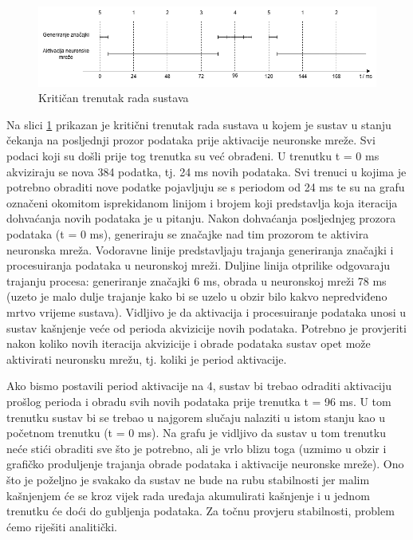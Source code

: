 \begin{figure}[htb]
    \centering
    \includegraphics[width=1\linewidth]{Chapters/implementacija/rts.png} 
    \caption{Kritičan trenutak rada sustava}
    \label{pic:rts}
\end{figure}

Na slici \ref{pic:rts} prikazan je kritični trenutak rada sustava u kojem je sustav 
u stanju čekanja na posljednji prozor podataka prije aktivacije neuronske mreže. Svi
podaci koji su došli prije tog trenutka su već obrađeni. U trenutku t = 0 ms akviziraju se
nova 384 podatka, tj. 24 ms novih podataka. Svi trenuci u kojima je potrebno obraditi nove podatke
pojavljuju se s periodom od 24 ms te su na grafu označeni okomitom isprekidanom linijom i brojem
koji predstavlja koja iteracija dohvaćanja novih podataka je u pitanju. Nakon dohvaćanja
posljednjeg prozora podataka (t = 0 ms), generiraju se značajke nad tim prozorom te aktivira neuronska mreža.
Vodoravne linije predstavljaju trajanja
generiranja značajki i procesuiranja podataka u neuronskoj mreži. Duljine linija otprilike
odgovaraju trajanju procesa: generiranje značajki 6 ms, obrada u neuronskoj mreži 78 ms 
(uzeto je malo dulje trajanje kako bi se uzelo u obzir bilo kakvo nepredviđeno mrtvo vrijeme sustava).
Vidljivo je da aktivacija i procesuiranje podataka unosi u sustav kašnjenje veće od perioda
akvizicije novih podataka. Potrebno je provjeriti nakon koliko novih iteracija akvizicije i obrade
podataka sustav opet može aktivirati neuronsku mrežu, tj. koliki je period aktivacije.

Ako bismo postavili period aktivacije na 4, sustav bi trebao odraditi aktivaciju prošlog
perioda i obradu svih novih podataka prije trenutka t = 96 ms. U tom trenutku sustav bi se trebao
u najgorem slučaju nalaziti u istom stanju kao u početnom trenutku (t = 0 ms). Na grafu
je vidljivo da sustav u tom trenutku neće stići obraditi sve što je potrebno, ali je vrlo blizu
toga (uzmimo u obzir i grafičko produljenje trajanja obrade podataka i aktivacije neuronske mreže). 
Ono što je poželjno je svakako da sustav ne bude na rubu stabilnosti jer malim kašnjenjem će se
kroz vijek rada uređaja akumulirati kašnjenje i u jednom trenutku će doći do gubljenja podataka.
Za točnu provjeru stabilnosti, problem ćemo riješiti analitički.

